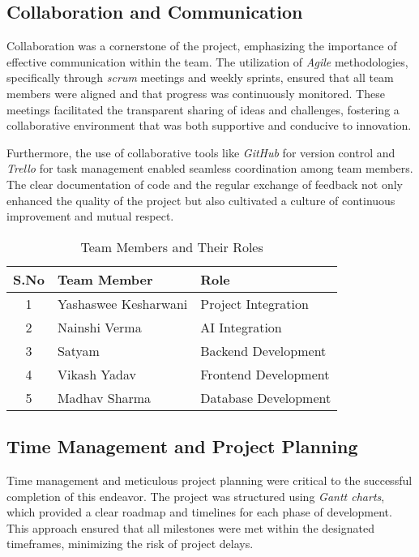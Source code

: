 \subsection{Collaboration and Communication}
Collaboration was a cornerstone of the project, emphasizing the importance of effective communication within the team. The utilization of \textit{Agile} methodologies, specifically through \textit{scrum} meetings and weekly sprints, ensured that all team members were aligned and that progress was continuously monitored. These meetings facilitated the transparent sharing of ideas and challenges, fostering a collaborative environment that was both supportive and conducive to innovation.

Furthermore, the use of collaborative tools like \textit{GitHub} for version control and \textit{Trello} for task management enabled seamless coordination among team members. The clear documentation of code and the regular exchange of feedback not only enhanced the quality of the project but also cultivated a culture of continuous improvement and mutual respect.

\begin{table}[h]
    \centering
    \begin{tabular}{|c|l|l|}
        \hline
        \textbf{S.No} & \textbf{Team Member} & \textbf{Role} \\
        \hline
        1 & Yashaswee Kesharwani & Project Integration \\
        2 & Nainshi Verma & \gls{AI} Integration \\
        3 & Satyam & Backend Development \\
        4 & Vikash Yadav & Frontend Development \\
        5 & Madhav Sharma & Database Development \\
        \hline
    \end{tabular}
    \caption{Team Members and Their Roles}
    \label{table:team_roles}
\end{table}

\subsection{Time Management and Project Planning}
Time management and meticulous project planning were critical to the successful completion of this endeavor. The project was structured using \textit{Gantt charts}, which provided a clear roadmap and timelines for each phase of development. This approach ensured that all milestones were met within the designated timeframes, minimizing the risk of project delays.


